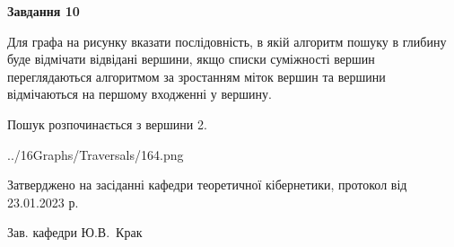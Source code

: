 \documentclass[12pt, ukrainian]{article}
\begin{document}
{\begin {large}
{\begin {center}\textbf{Завдання 10}\end {center}}\par
Для графа на рисунку вказати послідовність, в якій алгоритм пошуку в глибину буде відмічати відвідані вершини, якщо списки суміжності вершин переглядаються алгоритмом за зростанням міток вершин та вершини відмічаються на першому вход\-женні у вершину.\par
Пошук розпочинається з вершини 2.\par

\begin{center}
	{../16Graphs/Traversals/164.png}
\end{center}\par
\newpage


\end {large}
}
{\smallskip \begin {small} Затверджено на засіданні кафедри теоретичної кібернетики, протокол  від   23.01.2023 р.\par\smallskip\smallskip
{\parbox {6.5 cm}{Зав. кафедри \dotfill Ю.В.~Крак}} \end{small}}
\end{document}
